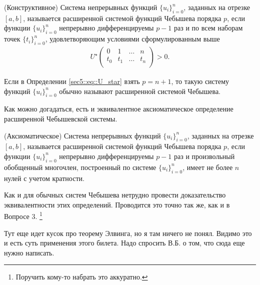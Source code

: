 \begin{dfn}(Конструктивное)
    \label{def::ChebExtendedP}
    Система непрерывных функций $\{u_i\}_{i = 0}^n$, заданных на отрезке $[a, b]$, называется расширенной системой функций Чебышева порядка $p$, если
    функции $\{u_i\}_{i = 0}^n$ непрерывно дифференцируемы $p - 1$ раз и по всем наборам точек $\{t_i\}_{i=0}^n$, удовлетворяющим условиями сформулированным выше
\begin{gather}
    U^\star \left(
    \begin{array}{cccc}
        0 & 1 & … & n \\
        t_0 & t_1 & … & t_n\\
    \end{array}  \right) > 0.
\end{gather}
\end{dfn}

Если в Определении \eqref{sec5::eq::U_star} взять $p = n + 1$, то такую систему функций $\{u_i\}_{i = 0}^n$ обычно называют расширенной системой Чебышева.

Как можно догадаться, есть и эквивалентное аксиоматическое определение расширенной Чебышевской системы.

\begin{dfn}(Аксиоматическое)
    \label{def::ChebExtendedP2}
    Система непрерывных функций $\{u_i\}_{i = 0}^n$, заданных на отрезке $[a, b]$, называется расширенной системой функций Чебышева порядка $p$, если
    функции $\{u_i\}_{i = 0}^n$ непрерывно дифференцируемы $p - 1$ раз и произвольный обобщенный многочлен, построенный по системе $\{u_i\}_{i = 0}^n$,
    имеет не более $n$ нулей с учетом кратности.
\end{dfn}

Как и для обычных систем Чебышева нетрудно провести доказательство эквивалентности этих определений. Проводится это точно так же, как и в Вопросе 3.
\footnote{\color{blue} Поручить кому-то набрать это аккуратно.}

{\color{blue} Тут еще идет кусок про теорему Элвинга, но я там ничего не понял. Видимо это и есть суть применения этого билета. Надо спросить В.Б. о том, что сюда еще нужно написать.}
